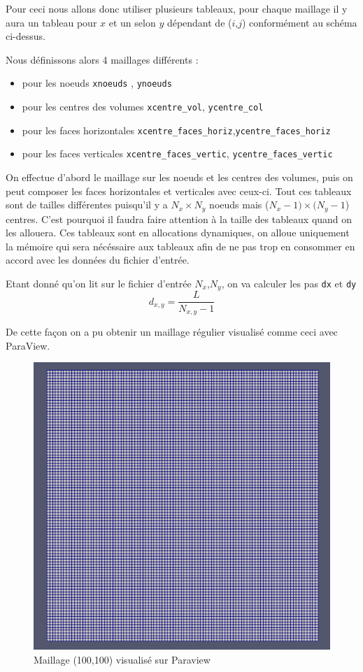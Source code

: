 \documentclass[a4paper,oneside]{article}
\makeatletter
\def\bigcenter{\trivlist \bigcentering\item\relax}
\def\bigcentering{\let\\\@centercr\rightskip\@bigflushglue%
\leftskip\@bigflushglue
\parindent\z@\parfillskip\z@skip}
\makeatother
\begin{document}
Pour ceci nous allons donc utiliser plusieurs tableaux, pour chaque maillage il y aura un tableau pour $x$ et un selon $y$ dépendant de ($i$,$j$) conformément au schéma ci-dessus.

Nous définissons alors 4 maillages différents :
\begin{itemize}
	\item pour les noeuds \verb?xnoeuds? , \verb?ynoeuds?
	\item pour les centres des volumes \verb?xcentre_vol?, \verb?ycentre_col?
	\item pour les faces horizontales \verb?xcentre_faces_horiz?,\verb?ycentre_faces_horiz?
	\item pour les faces verticales \verb?xcentre_faces_vertic?, \verb?ycentre_faces_vertic?
\end{itemize}

On effectue d'abord le maillage sur les noeuds et les centres des volumes, puis on peut composer les faces horizontales et verticales avec ceux-ci.
Tout ces tableaux sont de tailles différentes puisqu'il y a $N_x \times N_y$ noeuds mais ($N_x -1 )\times (N_y -1$) centres.
C'est pourquoi il faudra faire attention à la taille des tableaux quand on les allouera.
Ces tableaux sont en allocations dynamiques, on alloue uniquement la mémoire qui sera nécéssaire aux tableaux afin de ne pas trop en consommer en accord avec les données du fichier d'entrée. 


Etant donné qu'on lit sur le fichier d'entrée $N_x$,$N_y$, on va calculer les pas \verb?dx? et \verb?dy? 
\[
 d_{x,y} = \frac{L}{N_{x,y} -1}
\]

De cette façon on a pu obtenir un maillage régulier visualisé comme ceci avec ParaView.

\begin{figure}[h!]
\bigcenter
\includegraphics[scale=0.4]{Champ_Vitesse_Maillage/maillage100100.PNG}
\caption{Maillage (100,100) visualisé sur Paraview}
\end{figure}
\end{document}
